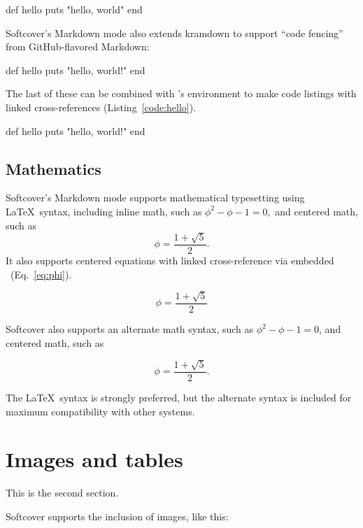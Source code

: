 \begin{code}
def hello
  puts "hello, world"
end
\end{code}

Softcover's Markdown mode also extends kramdown to support ``code fencing'' from GitHub-flavored Markdown:

\begin{code}
def hello
  puts "hello, world!"
end
\end{code}

The last of these can be combined with \PolyTeX's  environment to make code listings with linked cross-references (Listing~\ref{code:hello}).

\begin{codelisting}
\label{code:hello}
\begin{code}
def hello
  puts "hello, world!"
end
\end{code}
\end{codelisting}

\subsection{Mathematics}

Softcover's Markdown mode supports mathematical typesetting using \LaTeX\ syntax, including inline math, such as \( \phi^2 - \phi - 1 = 0, \) and centered math, such as
\[ \phi = \frac{1+\sqrt{5}}{2}. \]
It also supports centered equations with linked cross-reference via embedded \PolyTeX\ (Eq.~\eqref{eq:phi}).

\begin{equation}
\label{eq:phi}
\phi = \frac{1+\sqrt{5}}{2}
\end{equation}

Softcover also supports an alternate math syntax, such as \(\phi^2 - \phi - 1 = 0\), and centered math, such as

\[\phi = \frac{1+\sqrt{5}}{2}.\]

The \LaTeX\ syntax is strongly preferred, but the alternate syntax is included for maximum compatibility with other systems.

\section{Images and tables}

This is the second section.

Softcover supports the inclusion of images, like this:

